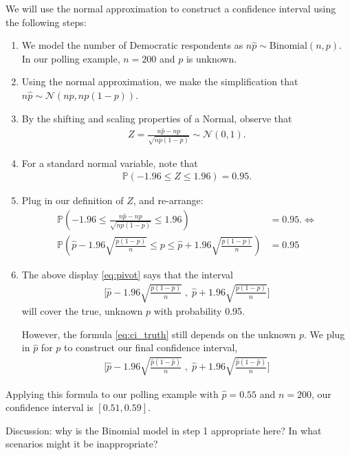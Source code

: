 \documentclass[11pt]{article}
\theoremstyle{definition}
\renewcommand{\P}{\mathbb{P}}
\begin{document}
We will use the normal approximation to
construct a confidence interval using the following steps:
\begin{enumerate}
  \item We model the number of Democratic respondents as
  $n\hat p \sim \text{Binomial}(n, p)$.
  In our polling example, $n = 200$ and $p$ is unknown.
  \item Using the normal approximation, we make the simplification that
  $n\hat p \sim \mathcal{N}(np, np(1-p))$.
  \item By the shifting and scaling properties
  of a Normal,
  observe that
  \begin{align*}
    Z = \frac{n\hat p - np}{\sqrt{np(1-p)}} \sim \mathcal{N}(0, 1).
  \end{align*}
  \item For a standard normal variable, note that
  \begin{align*}
    \P(-1.96 \leq Z \leq 1.96) = 0.95.
  \end{align*}
  \item Plug in our definition of $Z$, and re-arrange:
  \begin{align}
    \P\left(-1.96 \leq \frac{n\hat p - np}{\sqrt{np(1-p)}} \leq 1.96\right) &= 0.95.
    \iff \\
    \P\left(\hat p -1.96\sqrt{\frac{p(1-p)}{n}} \leq p \leq \hat p + 1.96\sqrt{\frac{p(1-p)}{n}}\right) &= 0.95
    \label{eq:pivot}
  \end{align}
  \item The above display \ref{eq:pivot} says that the interval
  \begin{align}
    \Big[\hat p - 1.96\sqrt{\frac{p(1-p)}{n}} \;,\;
    \hat p + 1.96\sqrt{\frac{p(1-p)}{n}}\Big]
    \label{eq:ci_truth}
  \end{align}
  will cover the true, unknown $p$ with probability 0.95.

  However, the formula \ref{eq:ci_truth} still depends on the unknown $p$.
  We plug in $\hat p$ for $p$ to construct our final confidence interval,
  \begin{align*}
    \Big[\hat p - 1.96\sqrt{\frac{\hat p(1-\hat p)}{n}} \;,\;
    \hat p + 1.96\sqrt{\frac{\hat p(1-\hat p)}{n}}\Big]
  \end{align*}
\end{enumerate}

Applying this formula to our polling example with $\hat p = 0.55$ and $n = 200$, our confidence interval is
$[0.51, 0.59]$.

Discussion: why is the Binomial model in step 1 appropriate here? In what scenarios might it be inappropriate?
\end{document}
